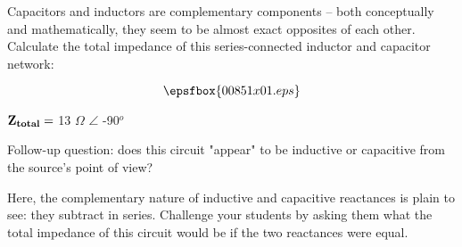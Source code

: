 

Capacitors and inductors are complementary components -- both conceptually and mathematically, they seem to be almost exact opposites of each other.  Calculate the total impedance of this series-connected inductor and capacitor network:

$$\epsfbox{00851x01.eps}$$







${\bf Z_{total}} =$ 13 $\Omega$ $\angle$ -90$^{o}$

\vskip 10pt

Follow-up question: does this circuit "appear" to be inductive or capacitive from the source's point of view?







Here, the complementary nature of inductive and capacitive reactances is plain to see: they subtract in series.  Challenge your students by asking them what the total impedance of this circuit would be if the two reactances were equal.




